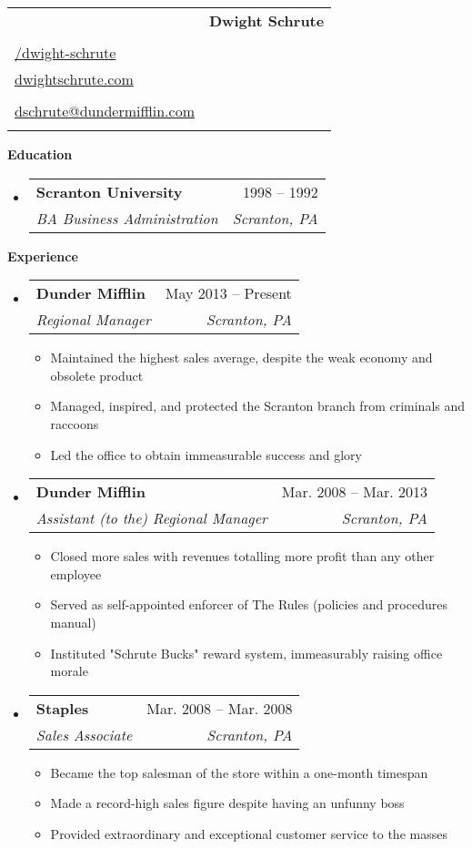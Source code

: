 \documentclass[letterpaper,12pt]{article}[leftmargin=*]
\makeatletter
\def \fullname {Dwight Schrute}
\def \photoavatar {\roundpic{1.8cm}{assets/Dwight_Schrute.jpg}} %
\def \subtitle {}
\def \linkedinicon {\faLinkedin}
\def \linkedinlink {https://linkedin.com/in/dwight-schrute/}
\def \linkedintext {/dwight-schrute}
\def \phoneicon {\faPhone}
\def \phonetext {+1-123-456-7890}
\def \emailicon {\faEnvelope}
\def \emaillink {mailto:dschrute@dundermifflin.com}
\def \emailtext {dschrute@dundermifflin.com}
\def \githubicon {\faGithub}
\def \githublink {https://github.com/dwight-schrute}
\def \githubtext {/dwight-schrute}
\def \websiteicon {\faGlobe}
\def \websitelink {https://google.com/}
\def \websitetext {dwightschrute.com}
\def \headertype {\singlecol} %
\def \entryspacing {-0pt}
\def \linkedin {\linkedinicon \hspace{3pt}\href{\linkedinlink}{\linkedintext}}
\def \phone {\phoneicon \hspace{3pt}{ \phonetext}}
\def \email {\emailicon \hspace{3pt}\href{\emaillink}{\emailtext}}
\def \github {\githubicon \hspace{3pt}\href{\githublink}{\githubtext}}
\def \website {\websiteicon \hspace{3pt}\href{\websitelink}{\websitetext}}
\renewcommand{\section}[2]{\vspace{5pt}
  \colorbox{secondary}{\color{white}\raggedbottom\normalsize\textbf{{#1}{\hspace{7pt}#2}}}
}
\newcommand{\resumeEntryStart}{\begin{itemize}[leftmargin=2.5mm]}
\newcommand{\resumeEntryEnd}{\end{itemize}\vspace{\entryspacing}}
\newcommand{\resumeItemListStart}{\begin{itemize}[leftmargin=4.5mm]}
\newcommand{\resumeItemListEnd}{\end{itemize}}
\newcommand{\roundpic}[2]{
  \begin{tabular}{m{#1} r}
    \hspace{-23pt}{
    \tikz\node [circle, minimum width = #1,
      path picture = {
        \node [xshift=0cm,yshift=0cm] at (path picture bounding box.center) {
          \texttt{[image: \#2]}};
    }] {};} & \vspace{-30pt}\textbf{\fullname}
  \end{tabular}
}
\newcommand{\none}{
  \hspace{-23pt}\textbf{\fullname}
}
\newcommand{\resumeItem}[1]{
  \item\small{
    {#1 \vspace{-2pt}}
  }
}
\newcommand{\resumeEntryTSDL}[4]{
  \vspace{-1pt}\item[]
    \begin{tabularx}{0.97\textwidth}{X@{\hspace{60pt}}r}
      \textbf{\color{primary}#1} & {\firabook\color{accent}\small#2} \\
      \textit{\color{accent}\small#3} & \textit{\color{accent}\small#4} \\
    \end{tabularx}\vspace{-6pt}
}
\newcommand{\doublecol}[6]{
  \begin{tabularx}{\textwidth}{Xr}
    {
      \begin{tabular}[c]{l}
        \fontsize{35}{45}\selectfont{\color{primary}{{\textbf{\fullname}}}} \\
        {\textit{\subtitle}} %
      \end{tabular}
    } & {
      \begin{tabular}[c]{l@{\hspace{1.5em}}l}
        {\small#4} & {\small#1} \\
        {\small#5} & {\small#2} \\
        {\small#6} & {\small#3}
      \end{tabular}
    }
  \end{tabularx}
}
\newcommand{\singlecol}[6]{
  \begin{tabularx}{\textwidth}{Xr}
    {
      \begin{tabular}[b]{l}
        \fontsize{35}{45}\selectfont{\color{primary}{
            \photoavatar
        }} \\
        {\textit{\subtitle}} %
      \end{tabular}
    } & {
      \begin{tabular}[c]{l}
        {\small#1} \\
        {\small#2} \\
        {\small#3} \\
        {\small#4} \\
        {\small#5} \\
        {\small#6}
      \end{tabular}
    }
  \end{tabularx}
}
\makeatother
\begin{document}


\headertype{\linkedin}{\github}{\website}{\phone}{\email}{} %
\vspace{-10pt} %

\section{\faGraduationCap}{Education}

  \resumeEntryStart
    \resumeEntryTSDL
      {Scranton University}{1998 -- 1992}
      {BA Business Administration}{Scranton, PA}
  \resumeEntryEnd

\section{\faPieChart}{Experience}

  \resumeEntryStart
    \resumeEntryTSDL
      {Dunder Mifflin}{May 2013 -- Present}
      {Regional Manager}{Scranton, PA}
    \resumeItemListStart
      \resumeItem {Maintained the highest sales average, despite the weak economy and obsolete product}
      \resumeItem {Managed, inspired, and protected the Scranton branch from criminals and raccoons}
      \resumeItem {Led the office to obtain immeasurable success and glory}
    \resumeItemListEnd
  \resumeEntryEnd

  \resumeEntryStart
    \resumeEntryTSDL
      {Dunder Mifflin}{Mar. 2008 -- Mar. 2013}
      {Assistant (to the) Regional Manager}{Scranton, PA}
    \resumeItemListStart
      \resumeItem {Closed more sales with revenues totalling more profit than any other employee}
      \resumeItem {Served as self-appointed enforcer of The Rules (policies and procedures manual)}
      \resumeItem {Instituted "Schrute Bucks" reward system, immeasurably raising office morale}
    \resumeItemListEnd
  \resumeEntryEnd

  \resumeEntryStart
    \resumeEntryTSDL
      {Staples}{Mar. 2008 -- Mar. 2008}
      {Sales Associate}{Scranton, PA}
    \resumeItemListStart
        \resumeItem {Became the top salesman of the store within a one-month timespan}
        \resumeItem {Made a record-high sales figure despite having an unfunny boss}
        \resumeItem {Provided extraordinary and exceptional customer service to the masses}
    \resumeItemListEnd
  \resumeEntryEnd
\end{document}
